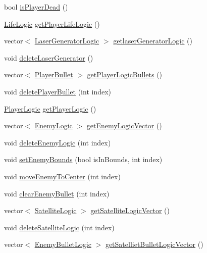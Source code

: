 \begin{DoxyCompactItemize}
\item 
bool \hyperlink{class_game_logic_a743d03f2c6dab3786addba9b2bc1e5dc}{is\+Player\+Dead} ()
\item 
\hyperlink{class_life_logic}{Life\+Logic} \hyperlink{class_game_logic_ad30541663e6b28e997646173fbdf344e}{get\+Player\+Life\+Logic} ()
\item 
vector$<$ \hyperlink{class_laser_generator_logic}{Laser\+Generator\+Logic} $>$ \hyperlink{class_game_logic_abe0e031ff3278ebb3c049b06f458e5b4}{getlaser\+Generator\+Logic} ()
\item 
void \hyperlink{class_game_logic_adc970904cd9d94e6e64b733863839ddf}{delete\+Laser\+Generator} ()
\item 
vector$<$ \hyperlink{class_player_bullet}{Player\+Bullet} $>$ \hyperlink{class_game_logic_a52d34b124f0bf66dee3a144e4645e60c}{get\+Player\+Logic\+Bullets} ()
\item 
void \hyperlink{class_game_logic_ae5629e5f0bf316435c6b4f40171755b9}{delete\+Player\+Bullet} (int index)
\item 
\hyperlink{class_player_logic}{Player\+Logic} \hyperlink{class_game_logic_a7aeb038bd7a0feef3377745ae334011c}{get\+Player\+Logic} ()
\item 
vector$<$ \hyperlink{class_enemy_logic}{Enemy\+Logic} $>$ \hyperlink{class_game_logic_afa1fd0270df0970723f3aef06431e2d8}{get\+Enemy\+Logic\+Vector} ()
\item 
void \hyperlink{class_game_logic_a34fd5f74aec0365dff0631384740a45b}{delete\+Enemy\+Logic} (int index)
\item 
void \hyperlink{class_game_logic_a48f8e18378ed00053d83da991fcad264}{set\+Enemy\+Bounds} (bool is\+In\+Bounds, int index)
\item 
void \hyperlink{class_game_logic_af355faaa66630a76a14ef0d7dc5adb54}{move\+Enemy\+To\+Center} (int index)
\item 
void \hyperlink{class_game_logic_aa8b94076dcd3ad6419c50d0036af97d6}{clear\+Enemy\+Bullet} (int index)
\item 
vector$<$ \hyperlink{class_satellite_logic}{Satellite\+Logic} $>$ \hyperlink{class_game_logic_a1110f512d8382700d322c6f1895810ea}{get\+Satellite\+Logic\+Vector} ()
\item 
void \hyperlink{class_game_logic_a3954ee824ac3acc8753f61f97d41ce89}{delete\+Satellite\+Logic} (int index)
\item 
vector$<$ \hyperlink{class_enemy_bullet_logic}{Enemy\+Bullet\+Logic} $>$ \hyperlink{class_game_logic_a230c5fb0084aa73c3b689c18a72b6adf}{get\+Satelliet\+Bullet\+Logic\+Vector} ()

\end{DoxyCompactItemize}

